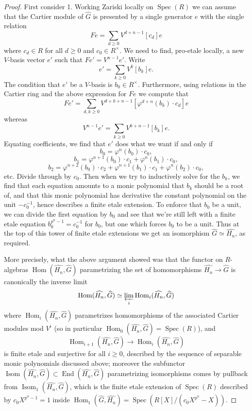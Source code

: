 \documentclass[12pt]{article}
\newcommand{\on}{\operatorname}
\begin{document}
\begin{proof}
First consider 1.  Working Zariski locally on $\on{Spec}(R)$ we can assume that the Cartier module of $\widehat{G}$ is presented by a single generator $e$ with the single relation
$$Fe = \sum_{d\geq 0} V^{d+n-1} [c_d]e$$
where $c_d\in R$ for all $d\geq 0$ and $c_0\in R^\times$.  We need to find, pro-etale locally, a new $V$-basis vector $e'$ such that $Fe'=V^{n-1}e'$.  Write
$$e' = \sum_{k\geq 0} V^k[b_k]e.$$
The condition that $e'$ be a $V$-basis is $b_0\in R^\times$.  Furthermore, using relations in the Cartier ring and the above expression for $Fe$ we compute that
$$Fe' = \sum_{d,k\geq 0} V^{d+k+n-1}[\varphi^{d+n}(b_k)\cdot c_d]e$$
whereas
$$V^{n-1}e' = \sum_{k\geq 0} V^{k+n-1}[b_k]e.$$
Equating coefficients, we find that $e'$ does what we want if and only if
$$b_0 = \varphi^n(b_0)\cdot c_0,$$
$$b_1 = \varphi^{n+1}(b_0)\cdot c_1 + \varphi^n(b_1)\cdot c_0,$$
$$b_2 = \varphi^{n+2}(b_0)\cdot c_2 + \varphi^{n+1}(b_1)\cdot c_1 + \varphi^n(b_2)\cdot c_0,$$
etc.  Divide through by $c_0$.  Then when we try to inductively solve for the $b_k$, we find that each equation amounts to a monic polynomial that $b_k$ should be a root of, and that this monic polynomial has derivative the constant polynomial on the unit $-c_0^{-1}$, hence describes a finite etale extension.  To enforce that $b_0$ be a unit, we can divide the first equation by $b_0$ and see that we're still left with a finite etale equation $b_0^{p^n-1}=c_0^{-1}$ for $b_0$, but one which forces $b_0$ to be a unit.  Thus at the top of this tower of finite etale extensions we get an isomorphism $\widehat{G}\simeq \widehat{H_n}$, as required.

More precisely, what the above argument showed was that the functor on $R$-algebras $\on{Hom}(\widehat{H_n},\widehat{G})$ parametrizing the set of homomorphisms $\widehat{H_n}\to\widehat{G}$ is canonically the inverse limit
$$\on{Hom}(\widehat{H_n},\widehat{G})\simeq \varprojlim_i \on{Hom}_i(\widehat{H_n},\widehat{G})$$
where $\on{Hom}_i(\widehat{H_n},\widehat{G})$ parametrizes homomorphisms of the associated Cartier modules mod $V^i$ (so in particular $\on{Hom}_0(\widehat{H_n},\widehat{G})=\on{Spec}(R)$), and
$$\on{Hom}_{i+1}(\widehat{H_n},\widehat{G})\to \on{Hom}_i(\widehat{H_n},\widehat{G})$$
is finite etale and surjective for all $i\geq 0$, described by the sequence of separable monic polynomials discussed above; moreover the subfunctor $\on{Isom}(\widehat{H_n},\widehat{G})\subset \on{End}(\widehat{H_n},\widehat{G})$ parametrizing isomorphisms comes by pullback from $\on{Isom}_1(\widehat{H_n},\widehat{G})$, which is the finite etale extension of $\on{Spec}(R)$ described by $c_0X^{p^n-1}=1$ inside $\on{Hom}_1(\widehat{G},\widehat{H_n})=\on{Spec}(R[X]/(c_0X^{p^n}-X))$.


\end{proof}
\end{document}
